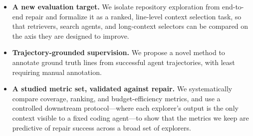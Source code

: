 \begin{itemize}[leftmargin=*,itemsep=2pt,topsep=0pt]

\item \textbf{A new evaluation target.} We isolate repository exploration from end-to-end repair and formalize it as a ranked, line-level context selection task, so that retrievers, search agents, and long-context selectors can be compared on the axis they are designed to improve.

\item \textbf{Trajectory-grounded supervision.} We propose a novel method to annotate ground truth lines from successful agent trajectories, with least requiring manual annotation.

\item \textbf{A studied metric set, validated against repair.} We systematically compare coverage, ranking, and budget-efficiency metrics, and use a controlled downstream protocol---where each explorer's output is the only context visible to a fixed coding agent---to show that the metrics we keep are predictive of repair success across a broad set of explorers.

\end{itemize}
